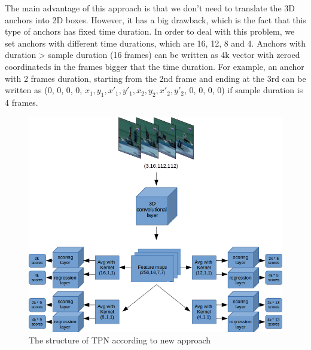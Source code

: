 \documentclass{report}
\begin{document}
The main advantage of this approach is that we don't need to translate the 3D anchors into 2D boxes. However, it has a big drawback, which is the fact that this type of anchors
has fixed time duration. In order to deal with this problem, we set anchors with different time durations, which are 16, 12, 8 and 4. Anchors with duration >
sample duration (16 frames) can be written as 4k vector with zeroed coordinateds in the frames bigger that the time duration. For example, an anchor with
2 frames duration, starting from the 2nd frame and ending at the 3rd can be written as (0, 0, 0, 0, $x_1, y_1, x'_1, y'_1, x_2, y_2, x'_2, y'_2$, 0, 0, 0, 0) if sample
duration is 4 frames. 

\begin{figure}[h]
  \centering
  \includegraphics[width=1.\textwidth]{tpn_2}
  \caption{The structure of TPN according to new approach}
  \label{fig:anchor_4k}
\end{figure}
\end{document}
